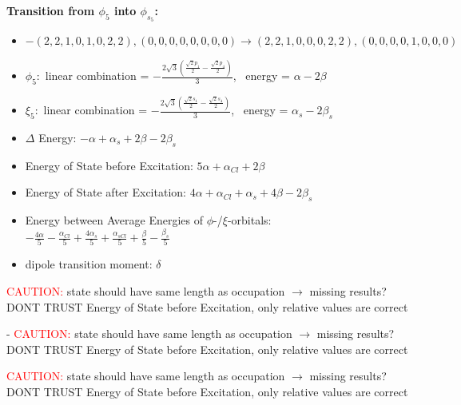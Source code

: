 \documentclass[12pt,a4paper]{article}
\begin{document}
        \noindent\textbf{Transition from $\phi_{5}$ into $\phi_{s_{5}}$:}
        \begin{itemize}
            \item $- (2, 2, 1, 0, 1, 0, 2, 2), (0, 0, 0, 0, 0, 0, 0, 0) \rightarrow (2, 2, 1, 0, 0, 0, 2, 2), (0, 0, 0, 0, 1, 0, 0, 0)$
        
            \item $\phi_{5}:$ linear combination = $- \frac{2 \sqrt{3} \left(\frac{\sqrt{2} p_{1}}{2} - \frac{\sqrt{2} p_{4}}{2}\right)}{3}$, \
            energy = $\alpha - 2 \beta$
            
            \item $\xi_{5}:$ linear combination = $- \frac{2 \sqrt{3} \left(\frac{\sqrt{2} s_{1}}{2} - \frac{\sqrt{2} s_{4}}{2}\right)}{3}$, \
            energy = $\alpha_{s} - 2 \beta_{s}$
            
            \item $\Delta$ Energy: $- \alpha + \alpha_{s} + 2 \beta - 2 \beta_{s}$
            \item Energy of State before Excitation: $5 \alpha + \alpha_{Cl} + 2 \beta$
            \item Energy of State after Excitation: $4 \alpha + \alpha_{Cl} + \alpha_{s} + 4 \beta - 2 \beta_{s}$
            \item Energy between Average Energies of $\phi$-/$\xi$-orbitals: \
            $- \frac{4 \alpha}{5} - \frac{\alpha_{Cl}}{5} + \frac{4 \alpha_{s}}{5} + \frac{\alpha_{s Cl}}{5} + \frac{\beta}{5} - \frac{\beta_{s}}{5}$
        
            \item dipole transition moment: $\delta$
        
        \end{itemize}
        
	\textcolor{red}{CAUTION:} state should have same length as occupation $\rightarrow$ missing results?
	DONT TRUST \glqq{}Energy of State before Excitation\grqq{}, only relative values are correct

 - 	\textcolor{red}{CAUTION:} state should have same length as occupation $\rightarrow$ missing results?
	DONT TRUST \glqq{}Energy of State before Excitation\grqq{}, only relative values are correct

	\textcolor{red}{CAUTION:} state should have same length as occupation $\rightarrow$ missing results?
	DONT TRUST \glqq{}Energy of State before Excitation\grqq{}, only relative values are correct
\end{document}
